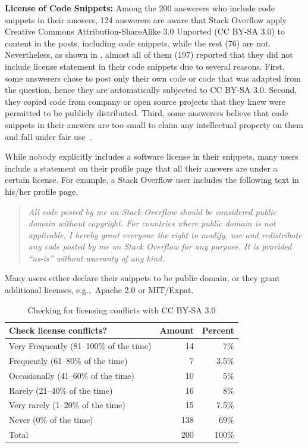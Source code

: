 \documentclass[10pt,journal,compsoc]{IEEEtran}
\begin{document}
\textbf{License of Code Snippets:} Among the 200 answerers who include code snippets in their answers, 124
answerers are aware that Stack Overflow apply Creative Commons
Attribution-ShareAlike 3.0 Unported (CC BY-SA 3.0) to content in the posts,
including code snippets, while the rest (76) are not. Nevertheless, as shown in
, almost all of them (197) reported that they
did not include license statement in their code snippets due to several reasons.
First, some answerers chose to post only their own code or code that was adapted
from the question, hence they are automatically subjected to CC BY-SA 3.0.
Second, they copied code from company or open source projects that they knew
were permitted to be publicly distributed. Third, some answerers believe that
code snippets in their answers are too small to claim any intellectual property
on them and fall under fair use~\cite{fairuse}.

While nobody explicitly includes a software license in their snippets,
many users include a statement on their profile page that all their
answers are under a certain license. For example, a Stack Overflow user includes 
the following text in his/her profile page.

\begin{quotation}
	\noindent \textit{All code posted by me on
		Stack Overflow should be considered public domain without copyright. For
		countries where public domain is not applicable, I hereby grant everyone the
		right to modify, use and redistribute any code posted by me on Stack Overflow
		for any purpose. It is provided ``as-is'' without warranty of any kind.}
\end{quotation}

Many users either declare their snippets to be public domain, or they grant
additional licenses, e.g.,\ Apache 2.0 or MIT/Expat.

\begin{table}
	\centering
	\caption{Checking for licensing conflicts with CC BY-SA 3.0}
	\label{tab:survey_license_check}
	\begin{tabular}{lrr}
		\toprule
		Check license conflicts? & Amount & Percent \\
		\midrule
		Very Frequently (81--100\% of the time)	& 14 & 7\% \\
		Frequently (61--80\% of the time) & 7 & 3.5\% \\
		Occasionally (41--60\% of the time) & 10 & 5\% \\
		Rarely (21--40\% of the time) & 16 & 8\% \\
		Very rarely (1--20\% of the time) & 15 & 7.5\% \\
		Never (0\% of the time) & 138 & 69\% \\
		\midrule
		Total & 200 & 100\% \\
		\bottomrule
	\end{tabular}
\end{table}
\end{document}
